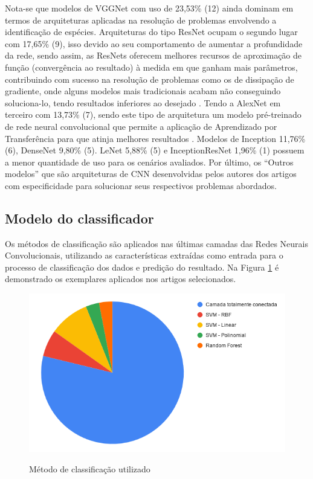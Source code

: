 \documentclass[
	12pt,				%
	oneside,			%
	a4paper,			%
	english,			%
	brazil				%
	]{abntex2ppgsi}
\begin{document}
Nota-se que modelos de VGGNet com uso de 23,53\% (12) ainda dominam em termos de arquiteturas aplicadas na resolução de problemas envolvendo a identificação de espécies. Arquiteturas do tipo ResNet ocupam o segundo lugar com 17,65\% (9), isso devido ao seu comportamento de aumentar a profundidade da rede, sendo assim, as ResNets oferecem melhores recursos de aproximação de função (convergência ao resultado) à medida em que ganham mais parâmetros, contribuindo com sucesso na resolução de problemas como os de dissipação de gradiente, onde alguns modelos mais tradicionais acabam não conseguindo soluciona-lo, tendo resultados inferiores ao desejado \cite{sun2017deep}. Tendo a AlexNet em terceiro com 13,73\% (7), sendo este tipo de arquitetura um modelo pré-treinado de rede neural convolucional que permite a aplicação de Aprendizado por Transferência para que atinja melhores resultados \cite{hongclassification}. Modelos de Inception 11,76\% (6), DenseNet 9,80\% (5). LeNet 5,88\% (5) e InceptionResNet 1,96\% (1) possuem a menor quantidade de uso para os cenários avaliados. Por último, os ``Outros modelos'' que são arquiteturas de CNN desenvolvidas pelos autores dos artigos com especificidade para solucionar seus respectivos problemas abordados.

\subsection{Modelo do classificador}

Os métodos de classificação são aplicados nas últimas camadas das Redes Neurais Convolucionais, utilizando as características extraídas como entrada para o processo de classificação dos dados e predição do resultado. Na Figura \ref{fig:grafico_classificador_vs_uso} é demonstrado os exemplares aplicados nos artigos selecionados.

\begin{figure}[H]
    \centering
    \caption{Método de classificação utilizado}
    \includegraphics[scale=.60]{imagens/grafico_classificador_vs_uso.png}
    \label{fig:grafico_classificador_vs_uso}
\end{figure}
\end{document}
